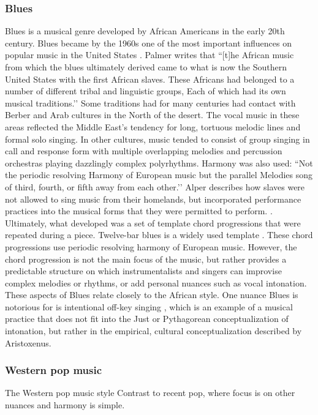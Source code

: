 \subsubsection{Blues}
Blues is a musical genre developed by African Americans in the early 20th century. Blues became by the 1960s one of the most important influences on popular music in the United States \cite{blues}. Palmer writes that ``[t]he African music from which the blues ultimately derived came to what is now the Southern United States with the first African slaves. These Africans had belonged to a number of different tribal and linguistic groups, Each of which had its own musical traditions.’’ \cite[p.~25]{palmer1981deep} Some traditions had for many centuries had contact with Berber and Arab cultures in the North of the desert. The vocal music in these areas reflected the Middle East’s tendency for long, tortuous melodic lines and formal solo singing. In other cultures, music tended to consist of group singing in call and response form with multiple overlapping melodies and percussion orchestras playing dazzlingly complex polyrhythms. Harmony was also used: ``Not the periodic resolving Harmony of European music but the parallel Melodies song of third, fourth, or fifth away from each other.’’ \cite[p.~27]{palmer1981deep} Alper describes how slaves were not allowed to sing music from their homelands, but incorporated performance practices into the musical forms that they were permitted to perform. \cite{alper2005flexibility}. Ultimately, what developed was a set of template chord progressions that were repeated during a piece. Twelve-bar blues is a widely used template \cite{alper2005flexibility}. These chord progressions use periodic resolving harmony of European music. However, the chord progression is not the main focus of the music, but rather provides a predictable structure on which instrumentalists and singers can improvise complex melodies or rhythms, or add personal nuances such as vocal intonation. These aspects of Blues relate closely to the African style. One nuance Blues is notorious for is intentional off-key singing \cite{autotuneBritannica}, which is an example of a musical practice that does not fit into the Just or Pythagorean conceptualization of intonation, but rather in the empirical, cultural conceptualization described by Aristoxenus.

\subsubsection{Western pop music}
The Western pop music style 
Contrast to recent pop, where focus is on other nuances and harmony is simple.

